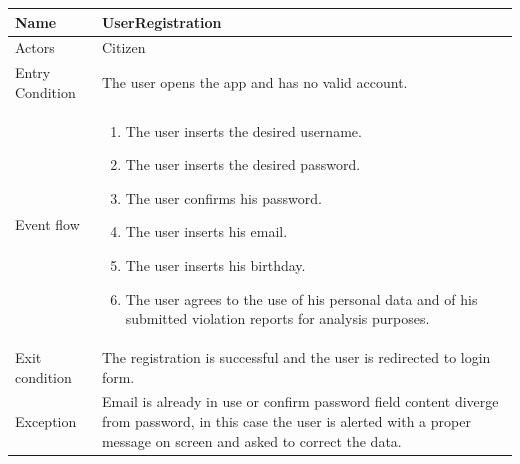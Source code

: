 \vskip 0.2in
\begin{tabular}{|p{3.7cm}|p{11cm}|}
\hline
Name & UserRegistration\\
\hline
Actors & Citizen\\
\hline
Entry Condition & The user opens the app and has no valid account.\\
\hline
Event flow & \begin{enumerate}
                \item The user inserts the desired username.
                \item The user inserts the desired password.
                \item The user confirms his password.
                \item The user inserts his email.
                \item The user inserts his birthday.
                \item The user agrees to the use of his personal data and of his submitted violation reports for analysis purposes.
            \end{enumerate}\\
\hline
Exit condition & The registration is successful and the user is redirected to login form.\\
\hline
Exception & Email is already in use or confirm password field content diverge from password, in this case the user is alerted with a proper message on screen and asked to correct the data.\\
\hline
\end{tabular}